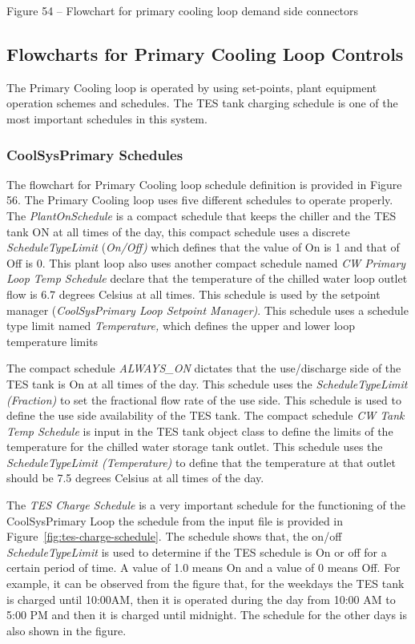 Figure 54 -- Flowchart for primary cooling loop demand side connectors

\subsection{Flowcharts for Primary Cooling Loop Controls}\label{flowcharts-for-primary-cooling-loop-controls}

The Primary Cooling loop is operated by using set-points, plant equipment operation schemes and schedules. The TES tank charging schedule is one of the most important schedules in this system.

\subsubsection{CoolSysPrimary Schedules}\label{coolsysprimary-schedules}

The flowchart for Primary Cooling loop schedule definition is provided in Figure 56. The Primary Cooling loop uses five different schedules to operate properly.~ The \emph{PlantOnSchedule} is a compact schedule that keeps the chiller and the TES tank ON at all times of the day, this compact schedule uses a discrete \emph{ScheduleTypeLimit} (\emph{On/Off)} which defines that the value of On is 1 and that of Off is 0. This plant loop also uses another compact schedule named \emph{CW Primary Loop Temp Schedule} declare that the temperature of the chilled water loop outlet flow is 6.7 degrees Celsius at all times. This schedule is used by the setpoint manager (\emph{CoolSysPrimary Loop Setpoint Manager)}. This schedule uses a schedule type limit named \emph{Temperature,} which defines the upper and lower loop temperature limits

The compact schedule \emph{ALWAYS\_ON} dictates that the use/discharge side of the TES tank is On at all times of the day. This schedule uses the \emph{ScheduleTypeLimit (Fraction)} to set the fractional flow rate of the use side. This schedule is used to define the use side availability of the TES tank. The compact schedule \emph{CW Tank Temp Schedule} is input in the TES tank object class to define the limits of the temperature for the chilled water storage tank outlet. This schedule uses the \emph{ScheduleTypeLimit (Temperature)} to define that the temperature at that outlet should be 7.5 degrees Celsius at all times of the day.

The \emph{TES Charge Schedule} is a very important schedule for the functioning of the CoolSysPrimary Loop the schedule from the input file is provided in Figure~\ref{fig:tes-charge-schedule}. The schedule shows that, the on/off \emph{ScheduleTypeLimit} is used to determine if the TES schedule is On or off for a certain period of time. A value of 1.0 means On and a value of 0 means Off. For example, it can be observed from the figure that, for the weekdays the TES tank is charged until 10:00AM, then it is operated during the day from 10:00 AM to 5:00 PM and then it is charged until midnight. The schedule for the other days is also shown in the figure.

